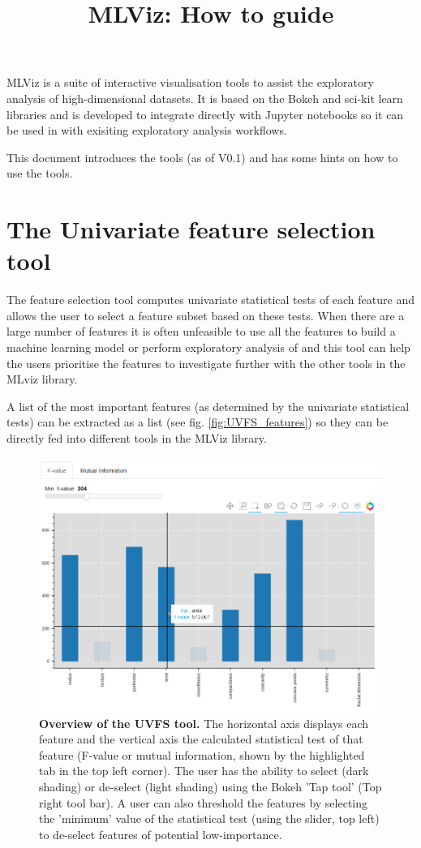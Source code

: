 \documentclass[11pt]{article} %
\title{MLViz: How to guide}
\date{} %
\begin{document}
\maketitle

MLViz is a suite of interactive visualisation tools to assist the exploratory analysis of high-dimensional datasets. It is based on the Bokeh and sci-kit learn libraries and is developed to integrate directly with Jupyter notebooks so it can be used in with exisiting exploratory analysis workflows. 

This document introduces the tools (as of V0.1) and has some hints on how to use the tools.

\section{The Univariate feature selection tool}

The feature selection tool computes univariate statistical tests of each feature and allows the user to select a feature subset based on these tests. When there are a large number of features it is often unfeasible to use all the features to build a machine learning model or perform exploratory analysis of and this tool can help the users prioritise the features to investigate further with the other tools in the MLviz library. 

A list of the most important features (as determined by the univariate statistical tests) can be extracted as a list (see fig. \ref{fig:UVFS_features}) so they can be directly fed into different tools in the MLViz library.

\begin{figure}[!h]
\centering
\includegraphics[width=4.5in]{images/UVFS_tool_annotated.png}
\caption{\textbf{Overview of the UVFS tool.} The horizontal axis displays each feature and the vertical axis the calculated statistical test of that feature (F-value or mutual information, shown by the highlighted tab in the top left corner). The user has the ability to select (dark shading) or de-select (light shading) using the Bokeh 'Tap tool' (Top right tool bar). A user can also threshold the features by selecting the 'minimum' value of the statistical test (using the slider, top left) to de-select features of potential low-importance.}
\label{fig:UVFS}
\end{figure}
\end{document}
